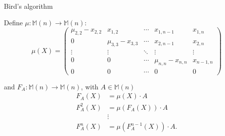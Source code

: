 \documentclass{beamer}
\begin{document}
\begin{frame}{Bird's algorithm}

    Define $\mu : \mathbb{M}(n) \to \mathbb{M}(n)$:
    \[
        \mu(X) =
        \begin{pmatrix}{}
            \mu_{2,2} - x_{2,2} & x_{1,2}             & \cdots & x_{1,n-1}           & x_{1,n} \\
            0                   & \mu_{3,3} - x_{3,3} & \cdots & x_{2,n-1}           & x_{2,n} \\
            \vdots              & \vdots              & \ddots & \vdots              & \vdots \\
            0                   & 0                   & \cdots & \mu_{n,n} - x_{n,n} & x_{n-1,n} \\
            0                   & 0                   & \cdots & 0                   & 0
        \end{pmatrix}
    \]

    \pause{}

    and $F_A : \mathbb{M}(n) \to \mathbb{M}(n)$,
    with $A \in \mathbb{M}(n)$
    \begin{align*}{}
        F_A(X)    & = \mu(X)\cdot A \\
        F_A^2(X)  & = \mu(F_A(X)) \cdot A \\
                  & \vdots \\
        F_A^n(X)  & = \mu(F_A^{n-1}(X)) \cdot A. \\
    \end{align*}

\end{frame}
\end{document}
